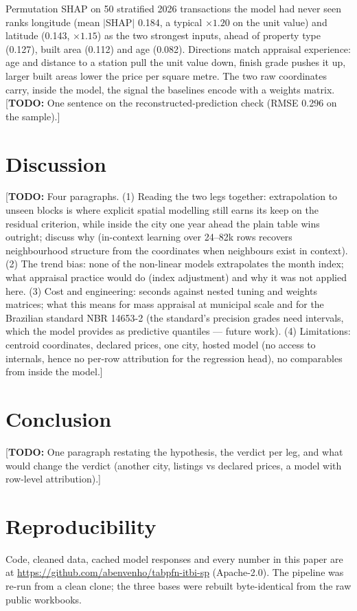 \documentclass[11pt,a4paper]{article}
\newcommand{\todo}[1]{\textcolor{red!70!black}{[\textbf{TODO:} #1]}}
\begin{document}
Permutation SHAP \citep{lundberg2017shap} on 50 stratified 2026 transactions the model had never
seen ranks longitude (mean $|$SHAP$|$ 0.184, a typical $\times 1.20$ on the unit value) and latitude
(0.143, $\times 1.15$) as the two strongest inputs, ahead of property type (0.127), built area
(0.112) and age (0.082). Directions match appraisal experience: age and distance to a station pull
the unit value down, finish grade pushes it up, larger built areas lower the price per square metre.
The two raw coordinates carry, inside the model, the signal the baselines encode with a weights
matrix. \todo{One sentence on the reconstructed-prediction check (RMSE 0.296 on the sample).}

\section{Discussion}
\label{sec:discussion}

\todo{Four paragraphs. (1) Reading the two legs together: extrapolation to unseen blocks is where
explicit spatial modelling still earns its keep on the residual criterion, while inside the city
one year ahead the plain table wins outright; discuss why (in-context learning over 24--82k rows
recovers neighbourhood structure from the coordinates when neighbours exist in context). (2) The
trend bias: none of the non-linear models extrapolates the month index; what appraisal practice
would do (index adjustment) and why it was not applied here. (3) Cost and engineering: seconds
against nested tuning and weights matrices; what this means for mass appraisal at municipal scale
and for the Brazilian standard NBR 14653-2 (the standard's precision grades need intervals, which
the model provides as predictive quantiles --- future work). (4) Limitations: centroid coordinates,
declared prices, one city, hosted model (no access to internals, hence no per-row attribution for
the regression head), no comparables from inside the model.}

\section{Conclusion}
\label{sec:conclusion}

\todo{One paragraph restating the hypothesis, the verdict per leg, and what would change the
verdict (another city, listings vs declared prices, a model with row-level attribution).}

\section*{Reproducibility}
Code, cleaned data, cached model responses and every number in this paper are at
\url{https://github.com/abenvenho/tabpfn-itbi-sp} (Apache-2.0). The pipeline was re-run from a
clean clone; the three bases were rebuilt byte-identical from the raw public workbooks.
\end{document}
